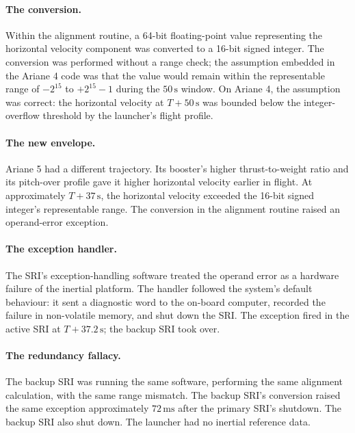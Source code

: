 \paragraph{The conversion.} Within the alignment routine, a 64-bit
floating-point value representing the horizontal velocity component
was converted to a 16-bit signed integer. The conversion was
performed without a range check; the assumption embedded in the
Ariane 4 code was that the value would remain within the
representable range of $-2^{15}$ to $+2^{15} - 1$ during the
$50 \,\si{\second}$ window. On Ariane 4, the assumption was correct:
the horizontal velocity at $T+50 \,\si{\second}$ was bounded below
the integer-overflow threshold by the launcher's flight profile.

\paragraph{The new envelope.} Ariane 5 had a different
trajectory. Its booster's higher thrust-to-weight ratio and its
pitch-over profile gave it higher horizontal velocity earlier in
flight. At approximately $T+37 \,\si{\second}$, the horizontal
velocity exceeded the 16-bit signed integer's representable range.
The conversion in the alignment routine raised an operand-error
exception.

\paragraph{The exception handler.} The SRI's exception-handling
software treated the operand error as a hardware failure of the
inertial platform. The handler followed the system's default
behaviour: it sent a diagnostic word to the on-board computer,
recorded the failure in non-volatile memory, and shut down the SRI.
The exception fired in the active SRI at $T+37.2 \,\si{\second}$;
the backup SRI took over.

\paragraph{The redundancy fallacy.} The backup SRI was running the
same software, performing the same alignment calculation, with the
same range mismatch. The backup SRI's conversion raised the same
exception approximately $72 \,\si{\milli\second}$ after the primary
SRI's shutdown. The backup SRI also shut down. The launcher had no
inertial reference data.

